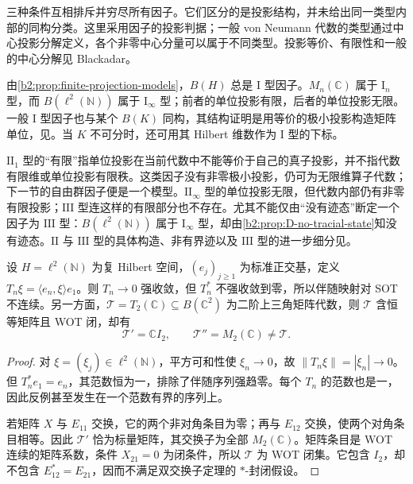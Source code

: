 三种条件互相排斥并穷尽所有因子。它们区分的是投影结构，并未给出同一类型内部的同构分类。这里采用因子的投影判据；一般 von Neumann 代数的类型通过中心投影分解定义，各个非零中心分量可以属于不同类型。投影等价、有限性和一般的中心分解见 Blackadar\cite[\nopp III.1.1.2; Definition III.1.3.1; III.1.4.5--III.1.4.7]{Blackadar2017OperatorAlgebrasCorrected}。

\ProseParagraphBreak
由\cref{b2:prop:finite-projection-models}，\(B(H)\) 总是 \(\mathrm I\) 型因子。\(M_n(\mathbb C)\) 属于 \(\mathrm I_n\) 型，而 \(B(\ell^2(\mathbb N))\) 属于 \(\mathrm I_\infty\) 型；前者的单位投影有限，后者的单位投影无限。一般 \(\mathrm I\) 型因子也与某个 \(B(K)\) 同构，其结构证明是用等价的极小投影构造矩阵单位，见\cite[\nopp III.1.5.2--III.1.5.3; III.1.5.12]{Blackadar2017OperatorAlgebrasCorrected}。当 \(K\) 不可分时，还可用其 Hilbert 维数作为 \(\mathrm I\) 型的下标。

\ProseParagraphBreak
\(\mathrm{II}_1\) 型的“有限”指单位投影在当前代数中不能等价于自己的真子投影，并不指代数有限维或单位投影有限秩。这类因子没有非零极小投影，仍可为无限维算子代数；下一节的自由群因子便是一个模型。\(\mathrm{II}_\infty\) 型的单位投影无限，但代数内部仍有非零有限投影；\(\mathrm{III}\) 型连这样的有限部分也不存在。尤其不能仅由“没有迹态”断定一个因子为 \(\mathrm{III}\) 型：\(B(\ell^2(\mathbb N))\) 属于 \(\mathrm I_\infty\) 型，却由\cref{b2:prop:D-no-tracial-state}知没有迹态。\(\mathrm{II}\) 与 \(\mathrm{III}\) 型的具体构造、非有界迹以及 \(\mathrm{III}\) 型的进一步细分见\cite[\nopp III.2.5; III.3; III.4.6]{Blackadar2017OperatorAlgebrasCorrected}。

\begin{proposition}\label{b2:prop:D-operator-topology-boundaries}
	设 \(H=\ell^2(\mathbb N)\) 为复 Hilbert 空间，\((e_j)_{j\ge1}\) 为标准正交基，定义 \(T_n\xi=\langle e_n,\xi\rangle e_1\)。则 \(T_n\to0\) 强收敛，但 \(T_n^*\) 不强收敛到零，所以伴随映射对 SOT 不连续。另一方面，\(\mathcal T=T_2(\mathbb C)\subseteq B(\mathbb C^2)\) 为二阶上三角矩阵代数，则 \(\mathcal T\) 含恒等矩阵且 WOT 闭，却有
	\[
		\mathcal T'=\mathbb CI_2,\qquad \mathcal T''=M_2(\mathbb C)\ne\mathcal T.
	\]
\end{proposition}
\begin{proof}
	对 \(\xi=(\xi_j)\in\ell^2(\mathbb N)\)，平方可和性使 \(\xi_n\to0\)，故 \(\|T_n\xi\|=|\xi_n|\to0\)。但 \(T_n^*e_1=e_n\)，其范数恒为一，排除了伴随序列强趋零。每个 \(T_n\) 的范数也是一，因此反例甚至发生在一个范数有界的序列上。

	若矩阵 \(X\) 与 \(E_{11}\) 交换，它的两个非对角条目为零；再与 \(E_{12}\) 交换，使两个对角条目相等。因此 \(\mathcal T'\) 恰为标量矩阵，其交换子为全部 \(M_2(\mathbb C)\)。矩阵条目是 WOT 连续的矩阵系数，条件 \(X_{21}=0\) 为闭条件，所以 \(\mathcal T\) 为 WOT 闭集。它包含 \(I_2\)，却不包含 \(E_{12}^*=E_{21}\)，因而不满足双交换子定理的 \(*\)-封闭假设。
\end{proof}

